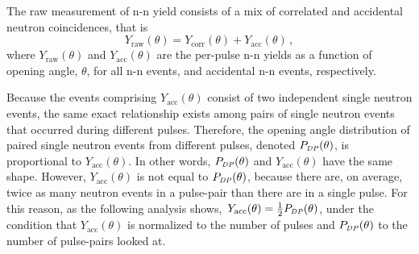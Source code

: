 \documentclass[%
 reprint,
 amsmath,amssymb,
 aps,
 nofootinbib
]{revtex4-1}
\begin{document}
The raw measurement of n-n yield consists of a mix of correlated and accidental neutron coincidences, that is
\begin{equation}
\label{eq:corr_uncorr}
Y_{\text{raw}}(\theta)= Y_{\text{corr}}(\theta) + Y_{\text{acc}}(\theta) \, ,
\end{equation}
where $Y_{\text{raw}}(\theta)$ and $Y_{\text{acc}}(\theta)$ are the per-pulse n-n yields as a function of opening angle, $\theta$, for all n-n events, and accidental n-n events, respectively.

Because the events comprising $Y_{\text{acc}}(\theta)$ consist of two independent single neutron events, the same exact relationship exists among pairs of single neutron events that occurred during different pulses.
Therefore, the opening angle distribution of paired single neutron events from different pulses, denoted $P_{\scaleto{DP}{4pt}}(\theta)$, is proportional to $Y_{\text{acc}}(\theta)$.
In other words,  $P_{\scaleto{DP}{4pt}}(\theta)$ and $Y_{\text{acc}}(\theta)$ have the same shape.
However, $Y_{\text{acc}}(\theta)$ is not equal to $P_{\scaleto{DP}{4pt}}(\theta)$, because there are, on average, twice as many neutron events in a pulse-pair than there are in a single pulse.
For this reason, as the following analysis shows,~$Y_{\text{acc}}(\theta) = \frac{1}{2}P_{\scaleto{DP}{4pt}}(\theta)$, under the condition that $Y_{\text{acc}}(\theta)$ is normalized to the number of pulses and $P_{\scaleto{DP}{4pt}}(\theta)$ to the number of pulse-pairs looked at.
\end{document}
